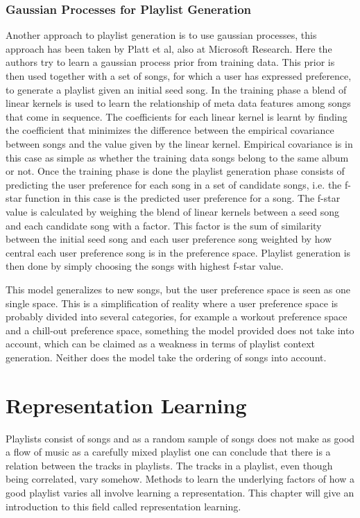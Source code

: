 \documentclass[a4paper,11pt]{kth-mag}
\begin{document}
\subsection{Gaussian Processes for Playlist Generation}
Another approach to playlist generation is to use gaussian processes, this approach has been taken by Platt et al, also at Microsoft Research. Here the authors try to learn a gaussian process prior from training data. This prior is then used together with a set of songs, for which a user has expressed preference, to generate a playlist given an initial seed song. In the training phase a blend of linear kernels is used to learn the relationship of meta data features among songs that come in sequence. The coefficients for each linear kernel is learnt by finding the coefficient that minimizes the difference between the empirical covariance between songs and the value given by the linear kernel. Empirical covariance is in this case as simple as whether the training data songs belong to the same album or not. Once the training phase is done the playlist generation phase consists of predicting the user preference for each song in a set of candidate songs, i.e. the f-star function in this case is the predicted user preference for a song. The f-star value is calculated by weighing the blend of linear kernels between a seed song and each candidate song with a factor. This factor is the sum of similarity between the initial seed song and each user preference song weighted by how central each user preference song is in the preference space. Playlist generation is then done by simply choosing the songs with highest f-star value\cite{platt2001learning}.

This model generalizes to new songs, but the user preference space is seen as one single space. This is a simplification of reality where a user preference space is probably divided into several categories, for example a workout preference space and a chill-out preference space, something the model provided does not take into account, which can be claimed as a weakness in terms of playlist context generation. Neither does the model take the ordering of songs into account.

\chapter{Representation Learning}
Playlists consist of songs and as a random sample of songs does not make as good a flow of music as a carefully mixed playlist one can conclude that there is a relation between the tracks in playlists. The tracks in a playlist, even though being correlated, vary somehow. Methods to learn the underlying factors of how a good playlist varies all involve learning a representation. This chapter will give an introduction to this field called representation learning.
\end{document}
